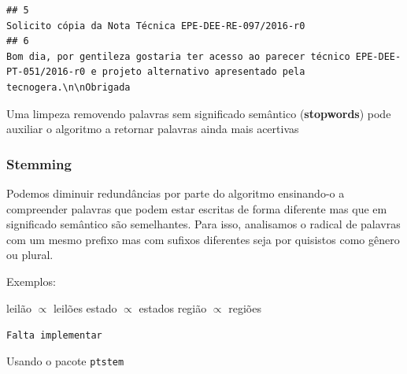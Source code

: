 \documentclass[]{article}
\newenvironment{Shaded}{\begin{snugshade}}{\end{snugshade}}
\newcommand{\KeywordTok}[1]{\textcolor[rgb]{0.13,0.29,0.53}{\textbf{#1}}}
\newcommand{\DecValTok}[1]{\textcolor[rgb]{0.00,0.00,0.81}{#1}}
\newcommand{\OperatorTok}[1]{\textcolor[rgb]{0.81,0.36,0.00}{\textbf{#1}}}
\newcommand{\NormalTok}[1]{#1}
\begin{document}
\begin{verbatim}
## 5                                                                                                                                                                                                                                                                                                                                                                                                                                                                                                       Solicito cópia da Nota Técnica EPE-DEE-RE-097/2016-r0
## 6                                                                                                                                                                                                                                                                                                                                                                                                          Bom dia, por gentileza gostaria ter acesso ao parecer técnico EPE-DEE-PT-051/2016-r0 e projeto alternativo apresentado pela tecnogera.\n\nObrigada
\end{verbatim}

Uma limpeza removendo palavras sem significado semântico
(\textbf{stopwords}) pode auxiliar o algoritmo a retornar palavras ainda
mais acertivas

\subsubsection{Stemming}\label{stemming}

Podemos diminuir redundâncias por parte do algoritmo ensinando-o a
compreender palavras que podem estar escritas de forma diferente mas que
em significado semântico são semelhantes. Para isso, analisamos o
radical de palavras com um mesmo prefixo mas com sufixos diferentes seja
por quisistos como gênero ou plural.

Exemplos:

leilão \(\propto\) leilões estado \(\propto\) estados região \(\propto\)
regiões

\texttt{Falta\ implementar}

Usando o pacote \texttt{ptstem}

\begin{Shaded}
\end{Shaded}
\end{document}
